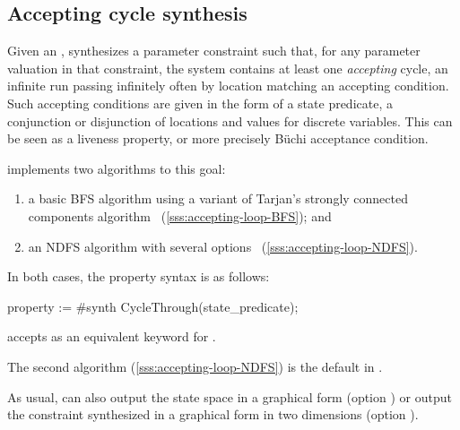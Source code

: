 \subsection{Accepting cycle synthesis}\label{ss:accepting-loop}
Given an \NIPTA{}, \imitator{} synthesizes a parameter constraint such that, for any parameter valuation in that constraint, the system contains at least one \emph{accepting} cycle, \ie{} an infinite run passing infinitely often by location matching an accepting condition.
Such accepting conditions are given in the form of a state predicate, \ie{} a conjunction or disjunction of locations and values for discrete variables.
This can be seen as a liveness property, or more precisely Büchi acceptance condition.

\imitator{} implements two algorithms to this goal:
\begin{enumerate}
	\item a basic BFS algorithm using a variant of Tarjan's strongly connected components algorithm~\cite{AAPP21} (\cref{sss:accepting-loop-BFS}); and
	\item an NDFS algorithm with several options~\cite{NPP18,AAPP21} (\cref{sss:accepting-loop-NDFS}).
\end{enumerate}

In both cases, the property syntax is as follows:

\begin{IMITATORproperty}
property := #synth CycleThrough(state_predicate);
\end{IMITATORproperty}

\begin{syntaxalias}
	\imitator{} accepts  as an equivalent keyword for .
\end{syntaxalias}



The second algorithm (\cref{sss:accepting-loop-NDFS}) is the default in \imitator{}.


As usual, \imitator{} can also
output the state space in a graphical form (option )
or
output the constraint synthesized in a graphical form in two dimensions (option ).


